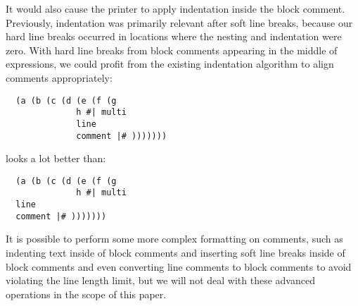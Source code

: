 It would also cause the printer to apply indentation inside the block comment.
Previously, indentation was primarily relevant after soft line breaks,
because our hard line breaks occurred in locations
where the nesting and indentation were zero.
With hard line breaks from block comments appearing in the middle of expressions,
we could profit from the existing indentation algorithm to align comments appropriately:
\begin{verbatim}
  (a (b (c (d (e (f (g
              h #| multi
              line
              comment |# )))))))
\end{verbatim}
looks a lot better than:
\begin{verbatim}
  (a (b (c (d (e (f (g
              h #| multi
  line
  comment |# )))))))
\end{verbatim}

It is possible to perform some more complex formatting on comments, such as
indenting text inside of block comments and
inserting soft line breaks inside of block comments and even
converting line comments to block comments to avoid violating the line length limit,
but we will not deal with these advanced operations in the scope of this paper.
